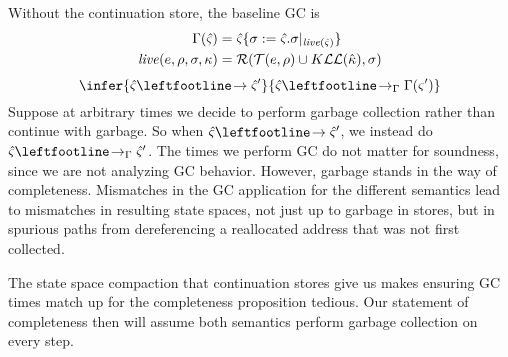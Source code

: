 Without the continuation store, the baseline GC is
\begin{align*}
  \Gamma(\hat\varsigma) &= \hat\varsigma\{ \sigma:=\hat\varsigma.\sigma|_{\mathit{live}(\hat\varsigma)} \} \\
  \mathit{live}(e,\rho,\sigma,\kappa) &= {\mathcal R}({\mathcal T}(e,\rho)\cup K{\mathcal L}{\mathcal L}({\hat{\kappa}}), \sigma)
\end{align*}
\begin{equation*}
  \infer{\mastate \stepto \mastate'}
        {\mastate \stepto_{\Gamma} \Gamma(\mstate')}  
\end{equation*}
Suppose at arbitrary times we decide to perform garbage collection rather than continue with garbage.
%
So when $\mastate \stepto \mastate'$, we instead do $\mastate \stepto_\Gamma \mastate'$.
%
The times we perform GC do not matter for soundness, since we are not analyzing GC behavior.
%
However, garbage stands in the way of completeness.
%
Mismatches in the GC application for the different semantics lead to mismatches in resulting state spaces, not just up to garbage in stores, but in spurious paths from dereferencing a reallocated address that was not first collected.
%

%
The state space compaction that continuation stores give us makes ensuring GC times match up for the completeness proposition tedious.
%
Our statement of completeness then will assume both semantics perform garbage collection on every step.
%

